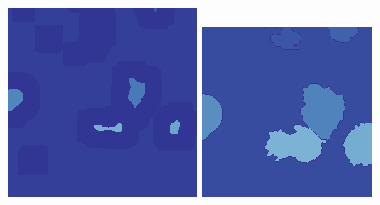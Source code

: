 \begin{figure}[b!]
	\includegraphics[width=0.97\linewidth]{Figures/Chapter2/6b2.png}	
	\includegraphics[width=0.97\linewidth]{Figures/Chapter2/6c2.png}
	\endminipage\hfill
	\centering	

\end{figure}
